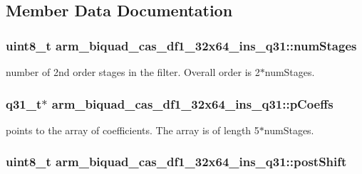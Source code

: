 \subsection{Member Data Documentation}
\hypertarget{structarm__biquad__cas__df1__32x64__ins__q31_ad7cb9a9f5df8f4fcfc7a0b633672e574}{
\subsubsection[{num\-Stages}]{\setlength{\rightskip}{0pt plus 5cm}uint8\-\_\-t arm\-\_\-biquad\-\_\-cas\-\_\-df1\-\_\-32x64\-\_\-ins\-\_\-q31\-::num\-Stages}}\label{structarm__biquad__cas__df1__32x64__ins__q31_ad7cb9a9f5df8f4fcfc7a0b633672e574}
number of 2nd order stages in the filter. Overall order is 2$\ast$num\-Stages. \hypertarget{structarm__biquad__cas__df1__32x64__ins__q31_a490462d6ebe0fecfb6acbf51bed22ecf}{
\subsubsection[{p\-Coeffs}]{\setlength{\rightskip}{0pt plus 5cm}q31\-\_\-t$\ast$ arm\-\_\-biquad\-\_\-cas\-\_\-df1\-\_\-32x64\-\_\-ins\-\_\-q31\-::p\-Coeffs}}\label{structarm__biquad__cas__df1__32x64__ins__q31_a490462d6ebe0fecfb6acbf51bed22ecf}
points to the array of coefficients. The array is of length 5$\ast$num\-Stages. \hypertarget{structarm__biquad__cas__df1__32x64__ins__q31_a8e9d58e8dba5aa3b2fc4f36d2ed07996}{
\subsubsection[{post\-Shift}]{\setlength{\rightskip}{0pt plus 5cm}uint8\-\_\-t arm\-\_\-biquad\-\_\-cas\-\_\-df1\-\_\-32x64\-\_\-ins\-\_\-q31\-::post\-Shift}}\label{structarm__biquad__cas__df1__32x64__ins__q31_a8e9d58e8dba5aa3b2fc4f36d2ed07996}
